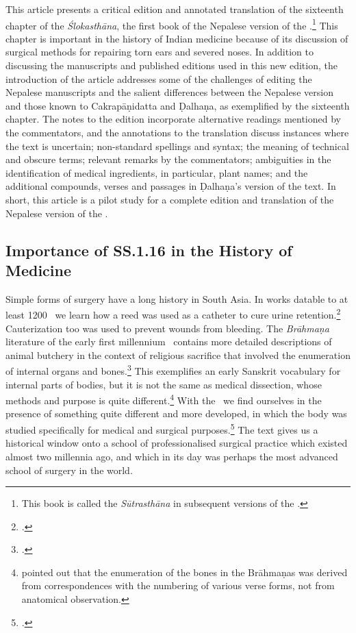 This article presents a critical edition and annotated translation of the sixteenth chapter of the \emph{Ślokasthāna}, the first book of the Nepalese version of the \SS.\footnote{This book is called the \emph{Sūtrasthāna} in subsequent versions of the \SS.} This chapter is important in the history of Indian medicine because of its discussion of surgical methods for repairing torn ears and severed noses. In addition to discussing the manuscripts and published editions used in this new edition, the introduction of the article addresses some of the challenges of editing the Nepalese manuscripts and the salient differences between the Nepalese version and those known to Cakrapāṇidatta and Ḍalhaṇa, as exemplified by the sixteenth chapter. The notes to the edition incorporate alternative readings mentioned by the commentators, and the annotations to the translation discuss instances where the text is uncertain; non-standard spellings and syntax; the meaning of technical and obscure terms; relevant remarks by the commentators; ambiguities in the identification of medical ingredients, in particular, plant names; and the additional compounds, verses and passages in Ḍalhaṇa's version of the text. In short, this article is a pilot study for a complete edition and translation of the Nepalese version of the \SS.


\subsection{Importance of SS.1.16 in the History of Medicine}


Simple forms of surgery have a long history in South Asia. In works datable to at
least 1200 \BC\ we learn how a reed was used as a catheter to cure urine
retention.\footcite[70--71]{zysk-1985} Cauterization too was used to prevent
wounds from bleeding. The \emph{Brāhmaṇa} literature of the early first 
millennium
\BC\ contains more detailed descriptions of animal butchery in the context of
religious sacrifice that involved the enumeration of internal organs and
bones.\footcite{mala-1996}   This exemplifies an early Sanskrit vocabulary for
internal parts of bodies, but it is not the same as medical dissection, whose
methods and purpose is quite different.\footnote{\citet{keit-1908} pointed out
that the enumeration of the bones in the Brāhmaṇas was derived from
correspondences with the numbering of various verse forms, not from anatomical
observation.}  With the \SS\ we find ourselves 
in
the presence of something quite different and more developed, in which the body
was studied specifically for medical and surgical purposes.\footcite{zysk-1986} 
The text gives us a historical window onto a school of
professionalised surgical practice which existed almost two millennia ago, and
which in its day was perhaps the most advanced school of surgery in the world.


